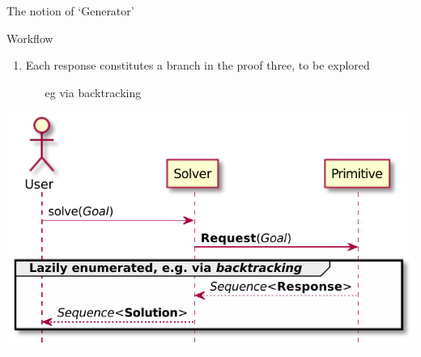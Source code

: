 \documentclass[presentation]{beamer}\mode<presentation>{\usetheme{AMSBolognaFC}}
\begin{document}
\begin{frame}[allowframebreaks]{The notion of `Generator'}
\begin{block}{Workflow}
\begin{enumerate}
            \item Each response constitutes a \alert{branch} in the proof three, \alert{to be explored}
            \begin{itemize}\scriptsize
                \item[eg] via \alert{backtracking} 
            \end{itemize}
        \end{enumerate}
    \end{block}

    \begin{center}
        \includegraphics[width=.8\linewidth]{figures/primitive-usage.pdf}
    \end{center}
\end{frame}
\end{document}
